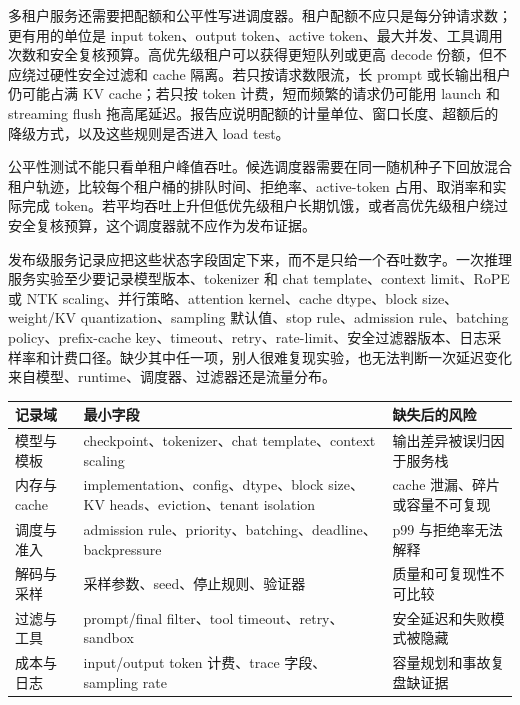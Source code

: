 \documentclass[UTF8,zihao=-4,openany]{ctexbook}
\begin{document}
多租户服务还需要把配额和公平性写进调度器。租户配额不应只是每分钟请求数；更有用的单位是 input token、output token、active token、最大并发、工具调用次数和安全复核预算。高优先级租户可以获得更短队列或更高 decode 份额，但不应绕过硬性安全过滤和 cache 隔离。若只按请求数限流，长 prompt 或长输出租户仍可能占满 KV cache；若只按 token 计费，短而频繁的请求仍可能用 launch 和 streaming flush 拖高尾延迟。报告应说明配额的计量单位、窗口长度、超额后的降级方式，以及这些规则是否进入 load test。

公平性测试不能只看单租户峰值吞吐。候选调度器需要在同一随机种子下回放混合租户轨迹，比较每个租户桶的排队时间、拒绝率、active-token 占用、取消率和实际完成 token。若平均吞吐上升但低优先级租户长期饥饿，或者高优先级租户绕过安全复核预算，这个调度器就不应作为发布证据。

发布级服务记录应把这些状态字段固定下来，而不是只给一个吞吐数字。一次推理服务实验至少要记录模型版本、tokenizer 和 chat template、context limit、RoPE 或 NTK scaling、并行策略、attention kernel、cache dtype、block size、weight/KV quantization、sampling 默认值、stop rule、admission rule、batching policy、prefix-cache key、timeout、retry、rate-limit、安全过滤器版本、日志采样率和计费口径。缺少其中任一项，别人很难复现实验，也无法判断一次延迟变化来自模型、runtime、调度器、过滤器还是流量分布。

\begin{center}
\small
\setlength{\tabcolsep}{3pt}
\begin{tabular}{@{}p{}p{}p{}@{}}
\toprule
记录域 & 最小字段 & 缺失后的风险 \\
\midrule
模型与模板 & checkpoint、tokenizer、chat template、context scaling & 输出差异被误归因于服务栈 \\
内存与 cache & implementation、config、dtype、block size、KV heads、eviction、tenant isolation & cache 泄漏、碎片或容量不可复现 \\
调度与准入 & admission rule、priority、batching、deadline、backpressure & p99 与拒绝率无法解释 \\
解码与采样 & 采样参数、seed、停止规则、验证器 & 质量和可复现性不可比较 \\
过滤与工具 & prompt/final filter、tool timeout、retry、sandbox & 安全延迟和失败模式被隐藏 \\
成本与日志 & input/output token 计费、trace 字段、sampling rate & 容量规划和事故复盘缺证据 \\
\bottomrule
\end{tabular}
\end{center}
\end{document}
